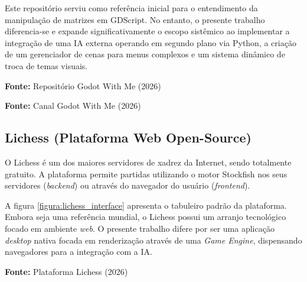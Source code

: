 Este repositório serviu como referência inicial para o entendimento da manipulação de matrizes em GDScript. No entanto, o presente trabalho diferencia-se e expande significativamente o escopo sistêmico ao implementar a integração de uma IA externa operando em segundo plano via Python, a criação de um gerenciador de cenas para menus complexos e um sistema dinâmico de troca de temas visuais.

\begin{center}
	\vspace{-0.2cm}
	\small \textbf{Fonte:} Repositório Godot With Me (2026)
\end{center}

\begin{center}
	\vspace{-0.2cm}
	\small \textbf{Fonte:} Canal Godot With Me (2026)
\end{center}

\subsection{Lichess (Plataforma Web Open-Source)}

O Lichess é um dos maiores servidores de xadrez da Internet, sendo totalmente gratuito. A plataforma permite partidas utilizando o motor Stockfish nos seus servidores (\textit{backend}) ou através do navegador do usuário (\textit{frontend}). 

A figura \ref{figura:lichess_interface} apresenta o tabuleiro padrão da plataforma. Embora seja uma referência mundial, o Lichess possui um arranjo tecnológico focado em ambiente \textit{web}. O presente trabalho difere por ser uma aplicação \textit{desktop} nativa focada em renderização através de uma \textit{Game Engine}, dispensando navegadores para a integração com a IA.

\begin{center}
	\vspace{-0.2cm}
	\small \textbf{Fonte:} Plataforma Lichess (2026)
\end{center}

